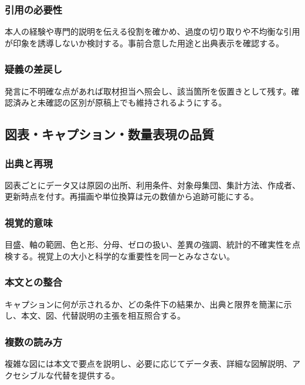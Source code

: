 \documentclass[a4paper,11pt]{article}
\begin{document}
\subsubsection{引用の必要性}
\par 本人の経験や専門的説明を伝える役割を確かめ、過度の切り取りや不均衡な引用が印象を誘導しないか検討する。事前合意した用途と出典表示を確認する。\par\medskip
\subsubsection{疑義の差戻し}
\par 発言に不明確な点があれば取材担当へ照会し、該当箇所を仮置きとして残す。確認済みと未確認の区別が原稿上でも維持されるようにする。\par\medskip
\subsection{図表・キャプション・数量表現の品質}
\subsubsection{出典と再現}
\par 図表ごとにデータ又は原図の出所、利用条件、対象母集団、集計方法、作成者、更新時点を付す。再描画や単位換算は元の数値から追跡可能にする。\par\medskip
\subsubsection{視覚的意味}
\par 目盛、軸の範囲、色と形、分母、ゼロの扱い、差異の強調、統計的不確実性を点検する。視覚上の大小と科学的な重要性を同一とみなさない。\par\medskip
\subsubsection{本文との整合}
\par キャプションに何が示されるか、どの条件下の結果か、出典と限界を簡潔に示し、本文、図、代替説明の主張を相互照合する。\par\medskip
\subsubsection{複数の読み方}
\par 複雑な図には本文で要点を説明し、必要に応じてデータ表、詳細な図解説明、アクセシブルな代替を提供する。\par\medskip
\end{document}
